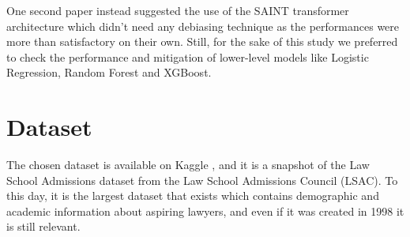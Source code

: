 \documentclass{article}
\begin{document}
One second paper \cite{Sulaiman2022fair} instead suggested the use of the SAINT transformer architecture which didn't need any debiasing technique as the performances were more than satisfactory on their own. Still, for the sake of this study we preferred to check the performance and mitigation of lower-level models like Logistic Regression, Random Forest and XGBoost.



\section{Dataset}
The chosen dataset is available on Kaggle \cite{danofer2022lawschool} , and it is a snapshot of the  Law School Admissions dataset from the Law School Admissions Council (LSAC). To this day, it is the largest dataset that exists which contains demographic and academic information about aspiring lawyers, and even if it was created in 1998 it is still relevant. 
\end{document}
